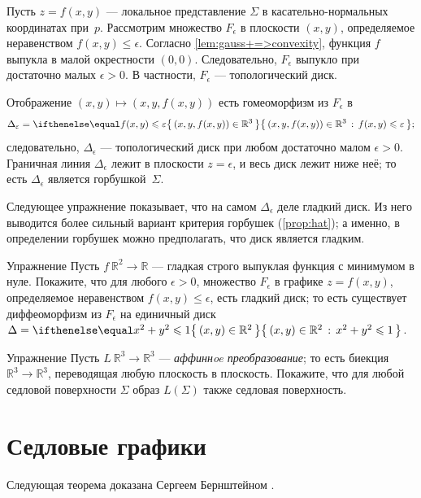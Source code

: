 Пусть $z=f(x,y)$ --- локальное представление $\Sigma$ в касательно-нормальных координатах при~$p$.
Рассмотрим множество $F_\epsilon$ в плоскости $(x,y)$, определяемое неравенством $f(x,y)\le \epsilon$.
Согласно \ref{lem:gauss+=>convexity}, функция $f$ выпукла в малой окрестности $(0,0)$.
Следовательно, $F_\epsilon$ выпукло при достаточно малых $\epsilon>0$.
В частности, $F_\epsilon$ --- топологический диск.

Отображение $(x,y)\mapsto (x,y,f(x,y))$ есть гомеоморфизм из $F_\epsilon$
в
\[\Delta_\epsilon=\set{(x,y,f(x,y))\in \mathbb{R}^3}{f(x,y)\le \epsilon};\]
следовательно,
$\Delta_\epsilon$ --- топологический диск при любом достаточно малом $\epsilon>0$.
Граничная линия $\Delta_\epsilon$ лежит в плоскости $z=\epsilon$, и весь диск лежит ниже неё;
то есть $\Delta_\epsilon$ является горбушкой~$\Sigma$.
\qeds

Следующее упражнение показывает, что на самом $\Delta_\epsilon$ деле гладкий диск.
Из него выводится более сильный вариант критерия горбушек (\ref{prop:hat});
а именно, в определении горбушек можно предполагать, что диск является гладким.

\begin{thm}{Упражнение}\label{ex:disc-hat}
Пусть $f\:\mathbb{R}^2\to\mathbb{R}$ --- гладкая строго выпуклая функция с минимумом в нуле.
Покажите, что для любого $\epsilon>0$, множество $F_\epsilon$ в графике $z=f(x,y)$, определяемое неравенством $f(x,y)\le \epsilon$, есть гладкий диск;
то есть существует диффеоморфизм из
$F_\epsilon$ на единичный диск $\Delta\z=\set{(x,y)\in\mathbb{R}^2}{x^2+y^2\le 1}$.
\end{thm}

\begin{thm}{Упражнение}\label{ex:saddle-linear}
Пусть $L\:\mathbb{R}^3\to\mathbb{R}^3$ --- \emph{аффиннoe преобразование}; то есть биекция $\mathbb{R}^3\to\mathbb{R}^3$, переводящая любую плоскость в плоскость. 
Покажите, что для любой седловой поверхности $\Sigma$ образ $L(\Sigma)$ также седловая поверхность.
\end{thm}




\section{Седловые графики}

Следующая теорема доказана Сергеем Бернштейном \cite{bernstein}.

